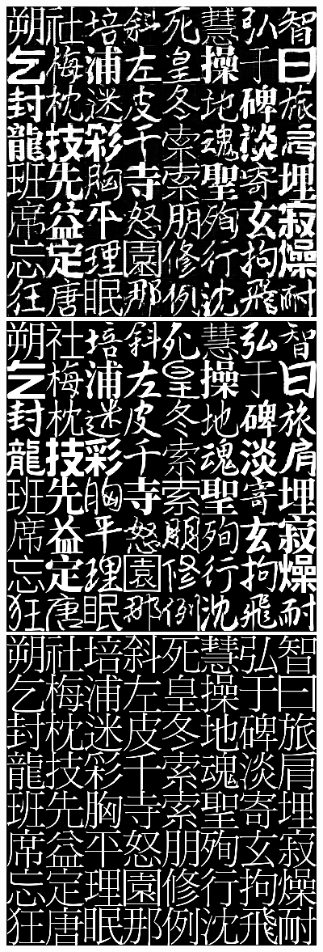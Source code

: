 \documentclass[10pt,twocolumn,letterpaper]{article}
\begin{document}
\begin{figure}[t]
	\begin{center}
		\includegraphics[width=0.8\linewidth]{385gen.png}
		\includegraphics[width=0.8\linewidth]{385gt.png}
		\includegraphics[width=0.8\linewidth]{385r1.png}

\end{center}
\end{figure}
\end{document}
